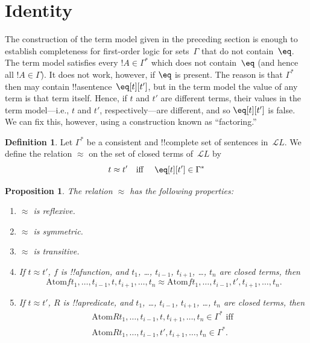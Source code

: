 \documentclass[10pt,a4paper]{article}
\theoremstyle{plain}
\newtheorem{prop}[thm]{Proposition}
\theoremstyle{definition}
\newtheorem{defn}[thm]{Definition}
\theoremstyle{remark}
\newenvironment{explain}{}{}
\newcommand*{\olfileid}[3]{}
\newcommand*{\olsection}[1]{\section*{#1}}
\newcommand*{\ollabel}[1]{\label{#1}}
\providecommand{\Lang}{\ensuremath{\mathcal{L}}}
\providecommand{\Atom}{\mathrm{Atom}}
\begin{document}
\olfileid{fol}{com}{ide}
\olsection{Identity}

\begin{explain}
The construction of the term model given in the preceding section is
enough to establish completeness for first-order logic for
sets~$\Gamma$ that do not contain~$\eq$.  The term model satisfies
every $!A \in \Gamma^*$ which does not contain~$\eq$ (and hence all
$!A \in \Gamma$).  It does not work, however, if $\eq$ is present.
The reason is that $\Gamma^*$ then may contain
!!a{sentence}~$\eq[t][t']$, but in the term model the value of any
term is that term itself.  Hence, if $t$ and $t'$ are different terms,
their values in the term model---i.e., $t$ and $t'$,
respectively---are different, and so $\eq[t][t']$ is false.  We can
fix this, however, using a construction known as ``factoring.''
\end{explain}

\begin{defn}
  Let $\Gamma^*$ be a consistent and !!{complete} set of sentences
  in~$\Lang L$.  We define the relation $\approx$ on the set of closed
  terms of~$\Lang L$ by
  \[
  t \approx t' \text{\quad iff \quad} \eq[t][t'] \in \Gamma^*
  \]
\end{defn}

\begin{prop}
\ollabel{prop:approx-equiv}
The relation $\approx$ has the following properties:
\begin{enumerate}
\item $\approx$ is reflexive.
\item $\approx$ is symmetric.
\item  $\approx$ is transitive.
\item If $t \approx t'$, $f$ is !!a{function}, and $t_1$, \dots,
  $t_{i-1}$, $t_{i+1}$, \dots, $t_n$ are closed terms, then
\[
\Atom{f}{t_1,\dots, t_{i-1}, t, t_{i+1}, \dots, t_n} \approx
\Atom{f}{t_1,\dots, t_{i-1}, t', t_{i+1}, \dots, t_n}.
\]
\item If $t \approx t'$, $R$ is !!a{predicate}, and $t_1$, \dots,
  $t_{i-1}$, $t_{i+1}$, \dots, $t_n$ are closed terms, then
\begin{multline*}
\Atom{R}{t_1,\dots, t_{i-1}, t, t_{i+1}, \dots, t_n} \in \Gamma^* \text{ iff } \\
\Atom{R}{t_1,\dots, t_{i-1}, t', t_{i+1}, \dots, t_n} \in \Gamma^*.
\end{multline*}
\end{enumerate}
\end{prop}
\end{document}
